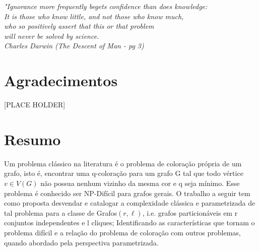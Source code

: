 \documentclass[a4paper,oneside,12pt]{book}
\begin{document}
\newpage


\newpage


\begin{flushright}
\begin{minipage}{0.5\textwidth}

\vspace{15.0cm}



\textit{"Ignorance more frequently begets confidence than does knowledge:\\
		It is those who know little, and not those who know much,\\ who so positively assert that this or that problem\\ will never be solved by science.\\
		Charles Darwin (The Descent of Man - pg 3)}
\end{minipage}
\end{flushright}


\chapter*{Agradecimentos}

\thispagestyle{myheadings}

\noindent

[PLACE HOLDER]




\chapter*{Resumo}

\thispagestyle{myheadings}

Um problema clássico na literatura é o problema de coloração própria de um grafo, isto é, encontrar uma q-coloração para um grafo G tal que todo vértice $v \in V(G)$ não possua nenhum vizinho da mesma cor e q seja mínimo. Esse problema é conhecido ser NP-Difícil para grafos gerais. O trabalho a seguir tem como proposta desvendar e catalogar a complexidade clássica e parametrizada de tal problema para a classe de Grafos$(r,\ell)$, i.e. grafos particionáveis em r conjuntos independentes e l cliques; Identificando as características que tornam o problema difícil e a relação do problema de coloração com outros problemas, quando abordado pela perspectiva parametrizada.
\end{document}
